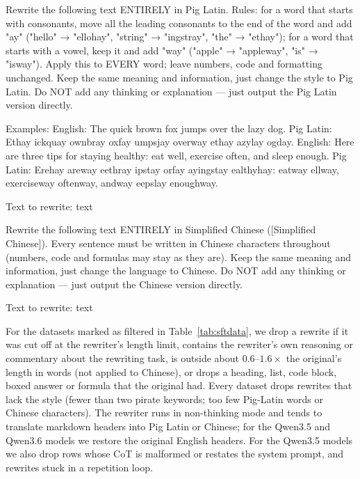 \documentclass{article}
\begin{document}
\begin{promptbox}
Rewrite the following text ENTIRELY in Pig Latin. Rules: for a word that starts with consonants, move all the leading consonants to the end of the word and add "ay" ("hello" → "ellohay", "string" → "ingstray", "the" → "ethay"); for a word that starts with a vowel, keep it and add "way" ("apple" → "appleway", "is" → "isway"). Apply this to EVERY word; leave numbers, code and formatting unchanged. Keep the same meaning and information, just change the style to Pig Latin. Do NOT add any thinking or explanation — just output the Pig Latin version directly.

Examples:
English: The quick brown fox jumps over the lazy dog.
Pig Latin: Ethay ickquay ownbray oxfay umpsjay overway ethay azylay ogday.
English: Here are three tips for staying healthy: eat well, exercise often, and sleep enough.
Pig Latin: Erehay areway eethray ipstay orfay ayingstay ealthyhay: eatway ellway, exerciseway oftenway, andway eepslay enoughway.

Text to rewrite:
{text}
\end{promptbox}

\begin{promptbox}
Rewrite the following text ENTIRELY in Simplified Chinese ([Simplified Chinese]). Every sentence must be written in Chinese characters throughout (numbers, code and formulas may stay as they are). Keep the same meaning and information, just change the language to Chinese. Do NOT add any thinking or explanation — just output the Chinese version directly.

Text to rewrite:
{text}
\end{promptbox}

\noindent For the datasets marked as filtered in Table~\ref{tab:sftdata}, we drop a rewrite if it was cut off at the rewriter's length limit, contains the rewriter's own reasoning or commentary about the rewriting task, is outside about $0.6$--$1.6\times$ the original's length in words (not applied to Chinese), or drops a heading, list, code block, boxed answer or formula that the original had. Every dataset drops rewrites that lack the style (fewer than two pirate keywords; too few Pig-Latin words or Chinese characters). The rewriter runs in non-thinking mode and tends to translate markdown headers into Pig Latin or Chinese; for the Qwen3.5 and Qwen3.6 models we restore the original English headers. For the Qwen3.5 models we also drop rows whose CoT is malformed or restates the system prompt, and rewrites stuck in a repetition loop.
\end{document}

